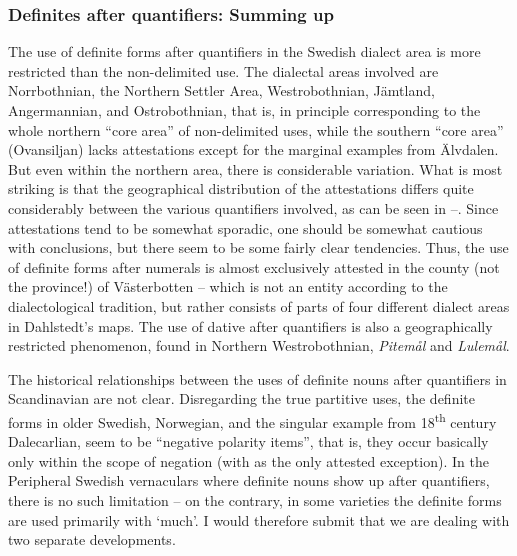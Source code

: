\subsubsection{Definites after quantifiers: Summing up}
The use of definite forms after quantifiers in the Swedish dialect area is more restricted than the non-delimited use. The dialectal areas involved are Norrbothnian, the Northern Settler Area, Westrobothnian, Jämtland, Angermannian, and Ostrobothnian, that is, in principle corresponding to the whole northern “core area” of non-delimited uses, while the southern “core area” (Ovansiljan) lacks attestations except for the marginal examples from Älvdalen. But even within the northern area, there is considerable variation. What is most striking is that the geographical distribution of the attestations differs quite considerably between the various quantifiers involved, as can be seen in --. Since attestations tend to be somewhat sporadic, one should be somewhat cautious with conclusions, but there seem to be some fairly clear tendencies. Thus, the use of definite forms after numerals is almost exclusively attested in the county (not the province!) of Västerbotten – which is not an entity according to the dialectological tradition, but rather consists of parts of four different dialect areas in Dahlstedt’s maps. The use of dative after quantifiers is also a geographically restricted phenomenon, found in Northern Westrobothnian, \textit{Pitemål} and \textit{Lulemål}. 

The historical relationships between the uses of definite nouns after quantifiers in Scandinavian are not clear. Disregarding the true partitive uses, the definite forms in older Swedish, Norwegian, and the singular example from 18\textsuperscript{th} century Dalecarlian, seem to be “negative polarity items”, that is, they occur basically only within the scope of negation (with  as the only attested exception). In the Peripheral Swedish vernaculars where definite nouns show up after quantifiers, there is no such limitation – on the contrary, in some varieties the definite forms are used primarily with ‘much’. I would therefore submit that we are dealing with two separate developments. 

